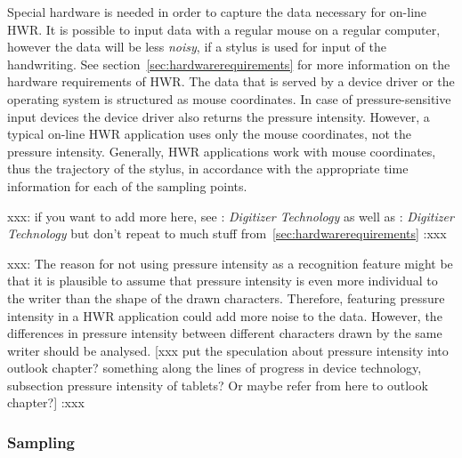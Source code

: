 Special hardware is needed in order to capture the data necessary 
for on-line HWR. It is possible to input data with a regular mouse on 
a regular computer, however the data will be less \emph{noisy}, 
if a stylus is used for input of the handwriting. 
See section~\ref{sec:hardwarerequirements} for more information on the hardware 
requirements of HWR. The data that is served by a device driver or the operating
system is structured as mouse coordinates. In case of pressure-sensitive input 
devices the device driver also returns the pressure intensity. 
However, a typical on-line HWR application uses only the mouse coordinates,
not the pressure intensity. Generally, HWR applications work with mouse
coordinates, thus the trajectory of the stylus, in accordance with the 
appropriate time information for each of the sampling points.

xxx: 
if you want to add more here, see :
\emph{Digitizer Technology} as well as :
\emph{Digitizer Technology} but don't repeat to much stuff 
from~\ref{sec:hardwarerequirements}
:xxx

xxx: 
The reason for not using pressure intensity as a recognition feature might be 
that it is plausible to assume that pressure intensity is even more individual 
to the writer than the shape of the drawn characters. 
Therefore, featuring pressure intensity in a HWR application could add more 
noise to the data. However, the differences in pressure intensity 
between different characters drawn by the same writer should be analysed.
[xxx put the speculation about pressure intensity into outlook chapter? 
something along the lines of progress in device technology, 
subsection pressure intensity of tablets? Or maybe refer from here to
outlook chapter?] 
:xxx

\subsubsection{Sampling}
\label{sec:sampling}

